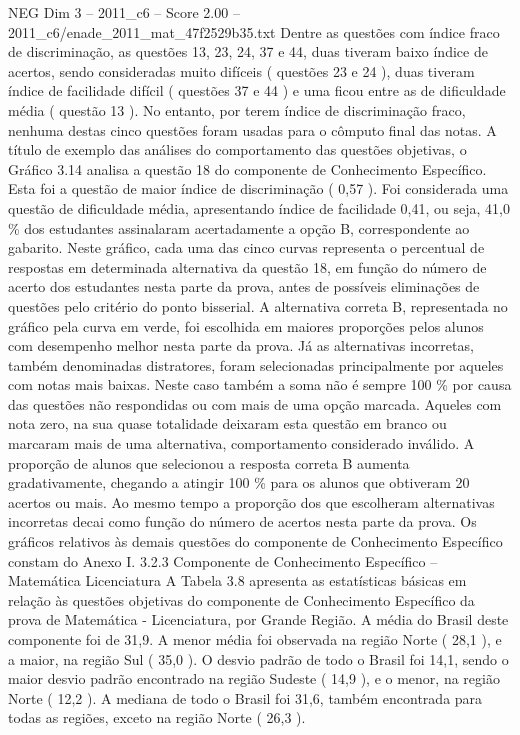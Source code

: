 \begin{textsample}{NEG Dim 3 – 2011\_c6 – Score 2.00 – 2011\_c6/enade\_2011\_mat\_47f2529b35.txt}
Dentre as questões com índice fraco de discriminação, as questões 13, 23, 24, 37 e 44, duas tiveram baixo índice de acertos, sendo consideradas muito difíceis ( questões 23 e 24 ), duas tiveram índice de facilidade difícil ( questões 37 e 44 ) e uma ficou entre as de dificuldade média ( questão 13 ).
No entanto, por terem índice de discriminação fraco, nenhuma destas cinco questões foram usadas para o cômputo final das notas.
A título de exemplo das análises do comportamento das questões objetivas, o Gráfico 3.14 analisa a questão 18 do componente de Conhecimento Específico.
Esta foi a questão de maior índice de discriminação ( 0,57 ).
Foi considerada uma questão de dificuldade média, apresentando índice de facilidade 0,41, ou seja, 41,0 \% dos estudantes assinalaram acertadamente a opção B, correspondente ao gabarito.
Neste gráfico, cada uma das cinco curvas representa o percentual de respostas em determinada alternativa da questão 18, em função do número de acerto dos estudantes nesta parte da prova, antes de possíveis eliminações de questões pelo critério do ponto bisserial.
A alternativa correta B, representada no gráfico pela curva em verde, foi escolhida em maiores proporções pelos alunos com desempenho melhor nesta parte da prova.
Já as alternativas incorretas, também denominadas distratores, foram selecionadas principalmente por aqueles com notas mais baixas.
Neste caso também a soma não é sempre 100 \% por causa das questões não respondidas ou com mais de uma opção marcada.
Aqueles com nota zero, na sua quase totalidade deixaram esta questão em branco ou marcaram mais de uma alternativa, comportamento considerado inválido.
A proporção de alunos que selecionou a resposta correta B aumenta gradativamente, chegando a atingir 100 \% para os alunos que obtiveram 20 acertos ou mais.
Ao mesmo tempo a proporção dos que escolheram alternativas incorretas decai como função do número de acertos nesta parte da prova.
Os gráficos relativos às demais questões do componente de Conhecimento Específico constam do Anexo I. 3.2.3 Componente de Conhecimento Específico – Matemática Licenciatura A Tabela 3.8 apresenta as estatísticas básicas em relação às questões objetivas do componente de Conhecimento Específico da prova de Matemática - Licenciatura, por Grande Região.
A média do Brasil deste componente foi de 31,9.
A menor média foi observada na região Norte ( 28,1 ), e a maior, na região Sul ( 35,0 ).
O desvio padrão de todo o Brasil foi 14,1, sendo o maior desvio padrão encontrado na região Sudeste ( 14,9 ), e o menor, na região Norte ( 12,2 ).
A mediana de todo o Brasil foi 31,6, também encontrada para todas as regiões, exceto na região Norte ( 26,3 ).

\end{textsample}

